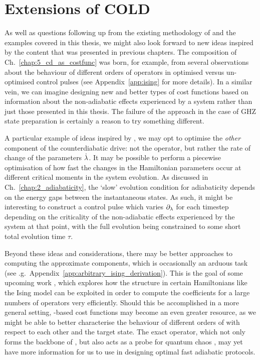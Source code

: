 \section{Extensions of COLD}

As well as questions following up from the existing methodology of  and the examples covered in this thesis, we might also look forward to new ideas inspired by the content that was presented in previous chapters. The composition of Ch.~\ref{chap:5_cd_as_costfunc} was born, for example, from several observations about the behaviour of different orders of  operators in optimised versus un-optimised control pulses (see Appendix~\ref{app:ising} for more details). In a similar vein, we can imagine designing new and better types of cost functions based on information about the non-adiabatic effects experienced by a system rather than just those presented in this thesis. The failure of the approach in the case of GHZ state preparation is certainly a reason to try something different.

A particular example of ideas inspired by , we may opt to optimise the \emph{other} component of the counterdiabatic drive: not the  operator, but rather the rate of change of the parameters $\dot{\lambda}$. It may be possible to perform a piecewise optimisation of how fast the changes in the Hamiltonian parameters occur at different critical moments in the system evolution. As discussed in Ch.~\ref{chap:2_adiabaticity}, the `slow' evolution condition for adiabaticity depends on the energy gaps between the instantaneous states. As such, it might be interesting to construct a control pulse which varies $\partial_{\lambda}$ for each timestep depending on the criticality of the non-adiabatic effects experienced by the system at that point, with the full evolution being constrained to some short total evolution time $\tau$.

Beyond these ideas and considerations, there may be better approaches to computing the approximate  components, which is occasionally an arduous task (see \@e.g.~Appendix~\ref{app:arbitrary_ising_derivation}). This is the goal of some upcoming work \cite{lawrence_numerical_2023}, which explores how the structure in certain Hamiltonians like the Ising model can be exploited in order to compute the  coefficients for a large numbers of operators very efficiently. Should this be accomplished in a more general setting, -based cost functions may become an even greater resource, as we might be able to better characterise the behaviour of different orders of  with respect to each other and the target state. The exact  operator, which not only forms the backbone of  \cite{kolodrubetz_geometry_2017, sels_minimizing_2017}, but also acts as a probe for quantum chaos \cite{pandey_adiabatic_2020, bhattacharjee_lanczos_2023}, may yet have more information for us to use in designing optimal fast adiabatic protocols.
